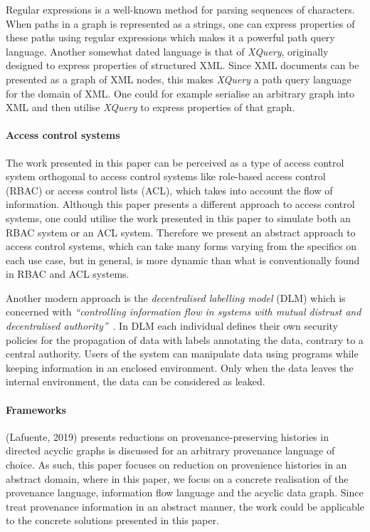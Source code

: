 Regular expressions is a well-known method for parsing sequences of characters. When paths in a graph is represented as a strings, one can express properties of these paths using regular expressions which makes it a powerful path query language. Another somewhat dated language is that of \emph{XQuery}, originally designed to express properties of structured XML. Since XML documents can be presented as a graph of XML nodes, this makes \emph{XQuery} a path query language for the domain of XML. One could for example serialise an arbitrary graph into XML and then utilise \emph{XQuery} to express properties of that graph.

\paragraph{Access control systems}
The work presented in this paper can be perceived as a type of access control system orthogonal to access control systems like role-based access control (RBAC) or access control lists (ACL), which takes into account the flow of information. Although this paper presents a different approach to access control systems, one could utilise the work presented in this paper to simulate both an RBAC system or an ACL system. Therefore we present an abstract approach to access control systems, which can take many forms varying from the specifics on each use case, but in general, is more dynamic than what is conventionally found in RBAC and ACL systems.

Another modern approach is the \emph{decentralised labelling model} (DLM) which is concerned with \emph{``controlling information flow in systems with mutual distrust and decentralised authority''}~\cite{myers1997decentralized}. In DLM each individual defines their own security policies for the propagation of data with labels annotating the data, contrary to a central authority. Users of the system can manipulate data using programs while keeping information in an enclosed environment. Only when the data leaves the internal environment, the data can be considered as leaked.

\paragraph{Frameworks} (Lafuente, 2019)\cite{lafuente2019framework} presents reductions on provenance-preserving histories in directed acyclic graphs is discussed for an arbitrary provenance language of choice. As such, this paper focuses on reduction on provenience histories in an abstract domain, where in this paper, we focus on a concrete realisation of the provenance language, information flow language and the acyclic data graph. Since \cite{lafuente2019framework} treat provenance information in an abstract manner, the work could be applicable to the concrete solutions presented in this paper.

